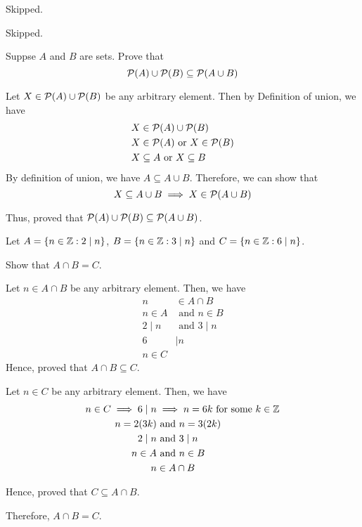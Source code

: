 \begin{problem}Skipped.\end{problem}
\begin{problem}Skipped.\end{problem}

\begin{problem} Suppse $A$ and $B$ are sets. Prove that
	$$\mathcal{P}(A) \cup \mathcal{P}(B) \subseteq \mathcal{P}(A \cup B)$$
\end{problem}

\begin{solution}
	Let $X \in \mathcal{P}(A) \cup \mathcal{P}(B)$ be any arbitrary element. Then by Definition of union, we have
	\begin{align}
		X &\in \mathcal{P}(A) \cup \mathcal{P}(B) \\
		X &\in \mathcal{P}(A) \text{ or } X \in \mathcal{P}(B) \\
		X &\subseteq A \text{ or } X \subseteq B
	\end{align}
	By definition of union, we have $A \subseteq A \cup B$. Therefore, we can show that 
	$$X \subseteq A \cup B \implies X \in \mathcal{P}(A \cup B)$$

	Thus, proved that $\mathcal{P}(A) \cup \mathcal{P}(B) \subseteq \mathcal{P}(A \cup B)$.
\end{solution}


\begin{problem}
	Let $A = \{n \in \mathbb{Z} : 2 \mid n\}$, $B = \{ n \in \mathbb{Z} : 3 \mid n \}$ and $C = \{ n \in \mathbb{Z} : 6 \mid n \}$.

	Show that $A \cap B = C$.
\end{problem}

\begin{solution}
	Let $n \in A \cap B$ be any arbitrary element. Then, we have
	\begin{align}
		n &\in A \cap B \\
		n \in A &\text{ and } n \in B \\
		2 \mid n &\text{ and } 3 \mid n \\
		6 &\mid n \\
		n \in C
	\end{align}
	Hence, proved that $A \cap B \subseteq C$.

	Let $n \in C$ be any arbitrary element. Then, we have
	\begin{align}
		n \in C \implies 6 \mid n &\implies n = 6k \text{ for some } k \in \mathbb{Z} \\
		n = 2(3k) &\text{ and } n = 3(2k) \\
		2 \mid n &\text{ and } 3 \mid n \\
		n \in A &\text{ and } n \in B \\
		n &\in A \cap B
	\end{align}

	Hence, proved that $C \subseteq A \cap B$.

	Therefore, $A \cap B = C$.
\end{solution}

